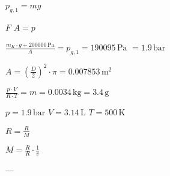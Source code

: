 \( p_{g,1} = mg \)  

\( F \)  
\( A = p \)  

\( \frac{m_K \cdot g + 200000 \, \text{Pa}}{A} = p_{g,1} = 190095 \, \text{Pa} \)  
\( = 1.9 \, \text{bar} \)  

\( A = \left(\frac{D}{2}\right)^2 \cdot \pi = 0.007853 \, \text{m}^2 \)  

\( \frac{p \cdot V}{R \cdot T} = m = 0.0034 \, \text{kg} = 3.4 \, \text{g} \)  

\( p = 1.9 \, \text{bar} \)  
\( V = 3.14 \, \text{L} \)  
\( T = 500 \, \text{K} \)  

\( R = \frac{R}{M} \)  

\( M = \frac{R}{R} \cdot \frac{1}{v} \)  

---